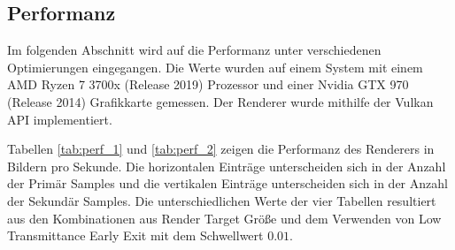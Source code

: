 \subsection{Performanz}
Im folgenden Abschnitt wird auf die Performanz unter verschiedenen Optimierungen eingegangen. Die Werte wurden auf einem System mit einem AMD Ryzen 7 3700x (Release 2019) Prozessor und einer Nvidia GTX 970 (Release 2014) Grafikkarte gemessen. Der Renderer wurde mithilfe der Vulkan API implementiert.

Tabellen \ref{tab:perf_1} und \ref{tab:perf_2} zeigen die Performanz des Renderers in Bildern pro Sekunde. Die horizontalen Einträge unterscheiden sich in der Anzahl der Primär Samples und die vertikalen Einträge unterscheiden sich in der Anzahl der Sekundär Samples. Die unterschiedlichen Werte der vier Tabellen resultiert aus den Kombinationen aus Render Target Größe und dem Verwenden von Low Transmittance Early Exit mit dem Schwellwert $ 0.01 $.

\begin{table}[H]
\centering
\resizebox{\columnwidth}{!}{%
    \begin{tabular}{|c|c|c|c|c|}
          \hline
        - & 16 & 32 & 48 & 64\\
        \hline
        1 & 47 & 29 & 21 & 10\\
        \hline
        2 & 43 & 26 & 19 & 10\\
        \hline
        3 & 41 & 23 & 14 & 6\\
        \hline
        4 & 39 & 23 & 13 & 6\\
        \hline
    \end{tabular}
    
    \begin{tabular}{|c|c|c|c|c|}
        \hline
        - & 16 & 32 & 48 & 64\\
        \hline
        1 & 43 & 26 & 19 & 8\\
        \hline
        2 & 39 & 23 & 18 & 8\\
        \hline
        3 & 37 & 21 & 13 & 6\\
        \hline
        4 & 34 & 21 & 12 & 6\\
        \hline
    \end{tabular}}
\caption{1920 x 1017 - Mit und ohne Early Exit}
\label{tab:perf_1}
\end{table}


